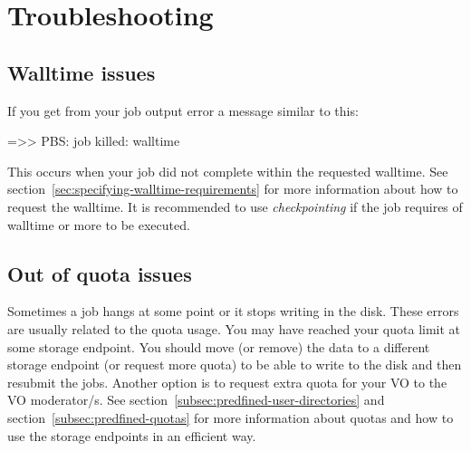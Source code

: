 \chapter{Troubleshooting}
\label{ch:troubleshooting}



\section{Walltime issues}
If you get from your job output error a message similar to this:

\begin{prompt}
 =>> PBS: job killed: walltime %
\end{prompt}

This occurs when your job did not complete within the requested walltime.
See section~\ref{sec:specifying-walltime-requirements} for more information about how to request the walltime.
It is recommended to use \emph{checkpointing} if the job requires  of walltime or more to be executed.



\section{Out of quota issues}

Sometimes a job hangs at some point or it stops writing in the disk. These errors are usually
related to the quota usage. You may have reached your quota limit at some storage endpoint. 
You should move (or remove) the data to a different storage endpoint (or request more quota) to be able to write to the disk and then resubmit the jobs.
Another option is to request extra quota for your VO to the VO moderator/s.
See section~\ref{subsec:predfined-user-directories} and section~\ref{subsec:predfined-quotas} for more information about 
quotas and how to use the storage endpoints in an efficient way.



